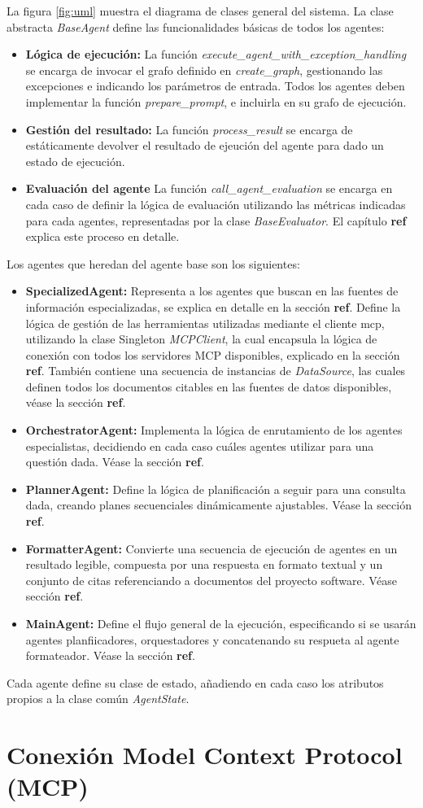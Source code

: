 La figura \ref{fig:uml} muestra el diagrama de clases general del sistema. La clase abstracta \textit{BaseAgent} define las funcionalidades básicas de todos los agentes: 
\begin{itemize}
  \item\textbf{Lógica de ejecución: }La función \textit{execute\_agent\_with\_exception\_handling} se encarga de invocar el grafo definido en \textit{create\_graph}, gestionando las excepciones e indicando los parámetros de entrada. Todos los agentes deben implementar la función \textit{prepare\_prompt}, e incluirla en su grafo de ejecución.
  \item\textbf{Gestión del resultado: }La función \textit{process\_result} se encarga de estáticamente devolver el resultado de ejeución del agente para dado un estado de ejecución. 
  \item\textbf{Evaluación del agente }La función \textit{call\_agent\_evaluation} se encarga en cada caso de definir la lógica de evaluación utilizando las métricas indicadas para cada agentes, representadas por la clase \textit{BaseEvaluator}. El capítulo \textbf{ref} explica este proceso en detalle.
\end{itemize}


Los agentes que heredan del agente base son los siguientes:
\begin{itemize}
  \item\textbf{SpecializedAgent: }Representa a los agentes que buscan en las fuentes de información especializadas, se explica en detalle en la sección \textbf{ref}. Define la lógica de gestión de las herramientas utilizadas mediante el cliente mcp, utilizando la clase Singleton \textit{MCPClient}, la cual encapsula la lógica de conexión con todos los servidores MCP disponibles, explicado en la sección \textbf{ref}. También contiene una secuencia de instancias de \textit{DataSource}, las cuales definen todos los documentos citables en las fuentes de datos disponibles, véase la sección \textbf{ref}.
  \item\textbf{OrchestratorAgent: }Implementa la lógica de enrutamiento de los agentes especialistas, decidiendo en cada caso cuáles agentes utilizar para una questión dada. Véase la sección \textbf{ref}. 
  \item\textbf{PlannerAgent: }Define la lógica de planificación a seguir para una consulta dada, creando planes secuenciales dinámicamente ajustables. Véase la sección \textbf{ref}.
  \item\textbf{FormatterAgent: }Convierte una secuencia de ejecución de agentes en un resultado legible, compuesta por una respuesta en formato textual y un conjunto de citas referenciando a documentos del proyecto software. Véase sección \textbf{ref}.
  \item\textbf{MainAgent: }Define el flujo general de la ejecución, especificando si se usarán agentes planfiicadores, orquestadores y concatenando su respueta al agente formateador. Véase la sección \textbf{ref}. 
\end{itemize}

Cada agente define su clase de estado, añadiendo en cada caso los atributos propios a la clase común \textit{AgentState}.

\section{Conexión Model Context Protocol (MCP)}

